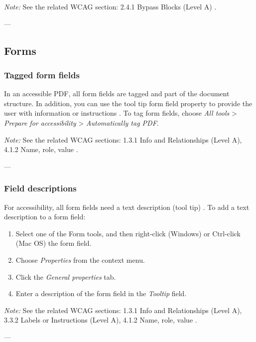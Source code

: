 \vspace{0.5em}
\noindent\textit{Note:} See the related WCAG section: 2.4.1 Bypass Blocks (Level A) \cite{WCAG}.

---

\subsection{Forms}
\label{subsec:acrobat-forms}
\subsubsection{Tagged form fields}
\label{subsubsec:acrobat-tagged-form-fields}
In an accessible PDF, all form fields are tagged and part of the document structure. In addition, you can use the tool tip form field property to provide the user with information or instructions \cite{AdobeHelpX}.
To tag form fields, choose \emph{All tools} > \emph{Prepare for accessibility} > \emph{Automatically tag PDF}.

\vspace{0.5em}
\noindent\textit{Note:} See the related WCAG sections: 1.3.1 Info and Relationships (Level A), 4.1.2 Name, role, value \cite{WCAG}.

---

\subsubsection{Field descriptions}
\label{subsubsec:acrobat-field-descriptions}
For accessibility, all form fields need a text description (tool tip) \cite{AdobeHelpX}.
To add a text description to a form field:
\begin{enumerate}
    \item Select one of the Form tools, and then right-click (Windows) or Ctrl-click (Mac OS) the form field.
    \item Choose \emph{Properties} from the context menu.
    \item Click the \emph{General properties} tab.
    \item Enter a description of the form field in the \emph{Tooltip} field.
\end{enumerate}

\vspace{0.5em}
\noindent\textit{Note:} See the related WCAG sections: 1.3.1 Info and Relationships (Level A), 3.3.2 Labels or Instructions (Level A), 4.1.2 Name, role, value \cite{WCAG}.

---

